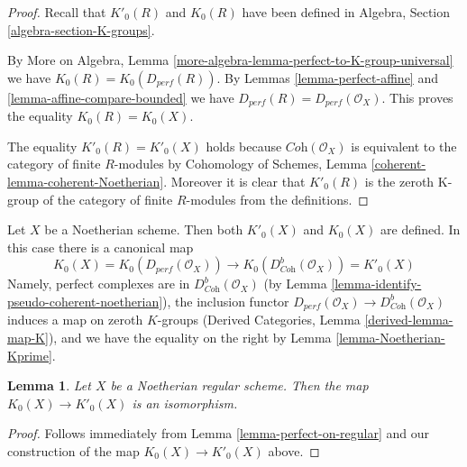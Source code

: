 \documentclass{stacks-project}
\theoremstyle{plain}
\newtheorem{lemma}[subsection]{Lemma}
\theoremstyle{definition}
\theoremstyle{remark}
\numberwithin{equation}{subsection}
\begin{document}
\begin{proof}
Recall that $K'_0(R)$ and $K_0(R)$ have been defined in
Algebra, Section \ref{algebra-section-K-groups}.

\medskip\noindent
By More on Algebra, Lemma \ref{more-algebra-lemma-perfect-to-K-group-universal}
we have $K_0(R) = K_0(D_{perf}(R))$.
By Lemmas \ref{lemma-perfect-affine} and \ref{lemma-affine-compare-bounded}
we have $D_{perf}(R) = D_{perf}(\mathcal{O}_X)$.
This proves the equality $K_0(R) = K_0(X)$.

\medskip\noindent
The equality $K'_0(R) = K'_0(X)$ holds because
$\textit{Coh}(\mathcal{O}_X)$ is equivalent to the category
of finite $R$-modules by Cohomology of Schemes, Lemma
\ref{coherent-lemma-coherent-Noetherian}. Moreover it is
clear that $K'_0(R)$ is the zeroth K-group of the category
of finite $R$-modules from the definitions.
\end{proof}

\noindent
Let $X$ be a Noetherian scheme. Then both $K'_0(X)$ and $K_0(X)$
are defined. In this case there is a canonical map
$$
K_0(X) = K_0(D_{perf}(\mathcal{O}_X))
\longrightarrow
K_0(D^b_{\textit{Coh}}(\mathcal{O}_X)) = K'_0(X)
$$
Namely, perfect complexes are in $D^b_{\textit{Coh}}(\mathcal{O}_X)$
(by Lemma \ref{lemma-identify-pseudo-coherent-noetherian}), the inclusion
functor
$D_{perf}(\mathcal{O}_X) \to D^b_{\textit{Coh}}(\mathcal{O}_X)$
induces a map on zeroth $K$-groups
(Derived Categories, Lemma \ref{derived-lemma-map-K}),
and we have the equality on the right by
Lemma \ref{lemma-Noetherian-Kprime}.

\begin{lemma}
\label{lemma-Kprime-K}
Let $X$ be a Noetherian regular scheme. Then
the map $K_0(X) \to K'_0(X)$ is an isomorphism.
\end{lemma}

\begin{proof}
Follows immediately from Lemma \ref{lemma-perfect-on-regular}
and our construction of the map $K_0(X) \to K'_0(X)$ above.
\end{proof}
\end{document}
